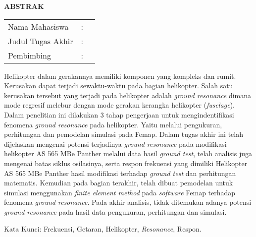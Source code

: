 \begin{center}
  \large\textbf{ABSTRAK}
\end{center}


\vspace{2ex}

\begingroup
\setlength{\tabcolsep}{0pt}

\noindent
\begin{tabularx}{\textwidth}{l >{\centering}m{2em} X}
  Nama Mahasiswa    & : & \name{}         \\

  Judul Tugas Akhir & : & \tatitle{}      \\

  Pembimbing        & : & \advisor{}   \\
  
\end{tabularx}
\endgroup

Helikopter dalam gerakannya memiliki komponen yang kompleks dan rumit. Kerusakan dapat terjadi sewaktu-waktu pada bagian helikopter. Salah satu kerusakan tersebut yang terjadi pada helikopter adalah \textit{ground resonance} dimana mode regresif melebur dengan mode gerakan kerangka helikopter (\textit{fuselage}). Dalam penelitian ini dilakukan 3 tahap pengerjaan untuk mengindentifikasi fenomena \textit{ground resonance} pada helikopter. Yaitu melalui pengukuran, perhitungan dan pemodelan simulasi pada Femap. Dalam tugas akhir ini telah dijelaskan mengenai potensi terjadinya \textit{ground resonance} pada modifikasi helikopter AS 565 MBe Panther melalui data hasil \textit{ground test}, telah analisis juga mengenai batas siklus osilasinya, serta respon frekuensi yang dimiliki Helikopter AS 565 MBe Panther hasil modifikasi terhadap \textit{ground test} dan perhitungan matematis. Kemudian pada bagian terakhir, telah dibuat pemodelan untuk simulasi menggunakan \textit{finite element method} pada \textit{software} Femap terhadap fenomena \textit{ground resonance}. Pada akhir analisis, tidak ditemukan adanya potensi \textit{ground resonance} pada hasil data pengukuran, perhitungan dan simulasi.

Kata Kunci: Frekuensi, Getaran, Helikopter, \textit{Resonance}, Respon.